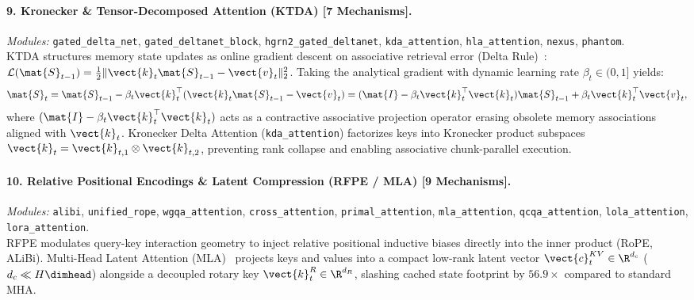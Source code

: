 \paragraph{9. Kronecker \& Tensor-Decomposed Attention (KTDA) [7 Mechanisms].}
\textit{Modules:} \texttt{gated\_delta\_net}, \texttt{gated\_deltanet\_block}, \texttt{hgrn2\_gated\_deltanet}, \texttt{kda\_attention}, \texttt{hla\_attention}, \texttt{nexus}, \texttt{phantom}. \\
KTDA structures memory state updates as online gradient descent on associative retrieval error (Delta Rule)~\cite{schlag2021deltanet}: $\mathcal{L}(\mat{S}_{t-1}) = \frac{1}{2}\|\vect{k}_t \mat{S}_{t-1} - \vect{v}_t\|_2^2$. Taking the analytical gradient with dynamic learning rate $\beta_t \in (0, 1]$ yields:
\begin{equation}
\mat{S}_t = \mat{S}_{t-1} - \beta_t \vect{k}_t^\top (\vect{k}_t \mat{S}_{t-1} - \vect{v}_t) = (\mat{I} - \beta_t \vect{k}_t^\top \vect{k}_t) \mat{S}_{t-1} + \beta_t \vect{k}_t^\top \vect{v}_t,
\end{equation}
where $(\mat{I} - \beta_t \vect{k}_t^\top \vect{k}_t)$ acts as a contractive associative projection operator erasing obsolete memory associations aligned with $\vect{k}_t$. Kronecker Delta Attention (\texttt{kda\_attention}) factorizes keys into Kronecker product subspaces $\vect{k}_t = \vect{k}_{t, 1} \otimes \vect{k}_{t, 2}$, preventing rank collapse and enabling associative chunk-parallel execution.

\paragraph{10. Relative Positional Encodings \& Latent Compression (RFPE / MLA) [9 Mechanisms].}
\textit{Modules:} \texttt{alibi}, \texttt{unified\_rope}, \texttt{wgqa\_attention}, \texttt{cross\_attention}, \texttt{primal\_attention}, \texttt{mla\_attention}, \texttt{qcqa\_attention}, \texttt{lola\_attention}, \texttt{lora\_attention}. \\
RFPE modulates query-key interaction geometry to inject relative positional inductive biases directly into the inner product (RoPE, ALiBi). Multi-Head Latent Attention (MLA)~\cite{deepseek2024mla} projects keys and values into a compact low-rank latent vector $\vect{c}_t^{KV} \in \R^{d_c}$ ($d_c \ll H \dimhead$) alongside a decoupled rotary key $\vect{k}_t^R \in \R^{d_R}$, slashing cached state footprint by $56.9\times$ compared to standard MHA.

